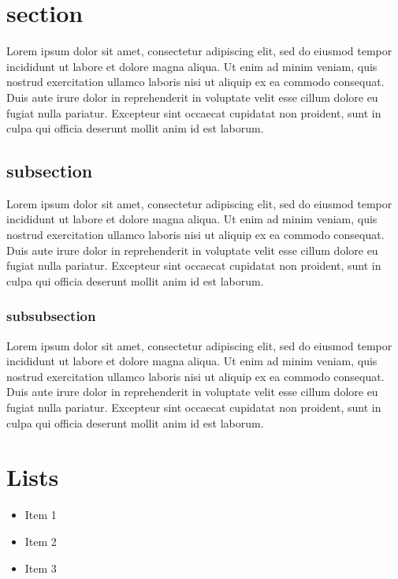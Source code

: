 \documentclass[12pt]{article}
\begin{document}
    \newpage

    \section{section}
    Lorem ipsum dolor sit amet, consectetur adipiscing elit, sed do eiusmod tempor incididunt ut labore et dolore magna aliqua. Ut enim ad minim veniam, quis nostrud exercitation ullamco laboris nisi ut aliquip ex ea commodo consequat. Duis aute irure dolor in reprehenderit in voluptate velit esse cillum dolore eu fugiat nulla pariatur. Excepteur sint occaecat cupidatat non proident, sunt in culpa qui officia deserunt mollit anim id est laborum.

    \subsection{subsection}
    Lorem ipsum dolor sit amet, consectetur adipiscing elit, sed do eiusmod tempor incididunt ut labore et dolore magna aliqua. Ut enim ad minim veniam, quis nostrud exercitation ullamco laboris nisi ut aliquip ex ea commodo consequat. Duis aute irure dolor in reprehenderit in voluptate velit esse cillum dolore eu fugiat nulla pariatur. Excepteur sint occaecat cupidatat non proident, sunt in culpa qui officia deserunt mollit anim id est laborum.
    
    \subsubsection{subsubsection}
    Lorem ipsum dolor sit amet, consectetur adipiscing elit, sed do eiusmod tempor incididunt ut labore et dolore magna aliqua. Ut enim ad minim veniam, quis nostrud exercitation ullamco laboris nisi ut aliquip ex ea commodo consequat. Duis aute irure dolor in reprehenderit in voluptate velit esse cillum dolore eu fugiat nulla pariatur. Excepteur sint occaecat cupidatat non proident, sunt in culpa qui officia deserunt mollit anim id est laborum.
    
    \section{Lists}
    
    \begin{itemize}
        \item Item 1
        \item Item 2
        \item Item 3
    \end{itemize}
    
\end{document}

